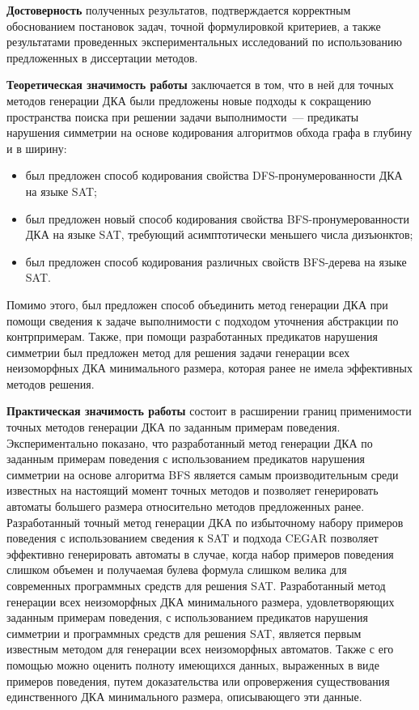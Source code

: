\textbf{Достоверность} полученных результатов, подтверждается корректным обоснованием постановок задач, точной формулировкой критериев, а также результатами проведенных экспериментальных исследований по использованию предложенных в диссертации методов.

\textbf{Теоретическая значимость работы} заключается в том, что в ней для точных методов генерации ДКА были предложены новые подходы к сокращению пространства поиска при решении задачи выполнимости~--- предикаты нарушения симметрии на основе кодирования алгоритмов обхода графа в глубину и в ширину:
\begin{itemize}
  \item был предложен способ кодирования свойства DFS-пронумерованности ДКА на языке SAT;
  \item был предложен новый способ кодирования свойства BFS-пронумерованности ДКА на языке SAT, требующий асимптотически меньшего числа дизъюнктов;
  \item был предложен способ кодирования различных свойств BFS-дерева на языке SAT.
\end{itemize}
Помимо этого, был предложен способ объединить метод генерации ДКА при помощи сведения к задаче выполнимости с подходом уточнения абстракции по контрпримерам.
Также, при помощи разработанных предикатов нарушения симметрии был предложен метод для решения задачи генерации всех неизоморфных ДКА минимального размера, которая ранее не имела эффективных методов решения.

\textbf{Практическая значимость работы} состоит в расширении границ применимости точных методов генерации ДКА по заданным примерам поведения. 
Экспериментально показано, что разработанный метод генерации ДКА по заданным примерам поведения с использованием предикатов нарушения симметрии на основе алгоритма BFS является самым производительным среди известных на настоящий момент точных методов и позволяет генерировать автоматы большего размера относительно методов предложенных ранее.
Разработанный точный метод генерации ДКА по избыточному набору примеров поведения с использованием сведения к SAT и подхода CEGAR позволяет эффективно генерировать автоматы в случае, когда набор примеров поведения слишком объемен и получаемая булева формула слишком велика для современных программных средств для решения SAT.
Разработанный метод генерации всех неизоморфных ДКА минимального размера, удовлетворяющих заданным примерам поведения, с использованием предикатов нарушения симметрии и программных средств для решения SAT, является первым известным методом для генерации всех неизоморфных автоматов.
Также с его помощью можно оценить полноту имеющихся данных, выраженных в виде примеров поведения, путем доказательства или опровержения существования единственного ДКА минимального размера, описывающего эти данные.  

